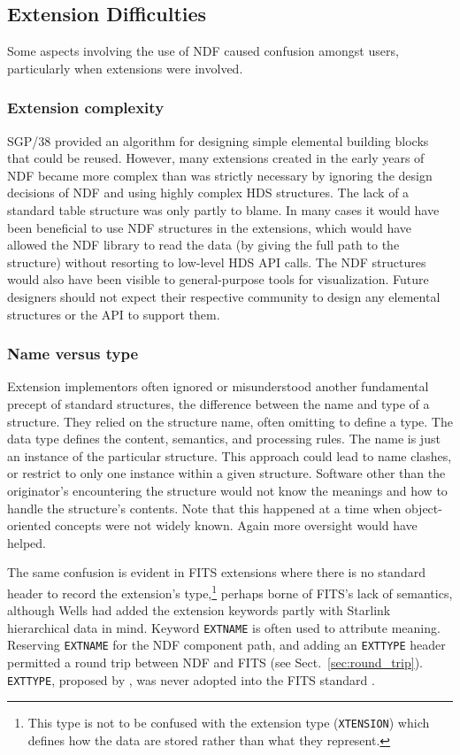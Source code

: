 \documentclass[final,authoryear,5p,times,twocolumn]{elsarticle}
\newcommand*\secref[1]{Sect.~\ref{#1}}
\begin{document}
\subsection{Extension Difficulties}

Some aspects involving the use of NDF caused confusion amongst users,
particularly when extensions were involved.

\subsubsection{Extension complexity}

SGP/38 \citep{SGP38} provided an algorithm for designing simple elemental
building blocks that could be reused. However, many extensions created
in the early years of NDF became more complex than was strictly
necessary by ignoring the design decisions of NDF and using highly
complex HDS structures.  The lack of a standard table structure was
only partly to blame.  In many cases it would have been beneficial to
use NDF structures in the extensions, which would have allowed the NDF
library to read the data (by giving the full path to the structure)
without resorting to low-level HDS API calls.  The NDF structures
would also have been visible to general-purpose tools for
visualization. Future designers should not expect their respective
community to design any elemental structures or the API to support
them.

\subsubsection{Name versus type}

Extension implementors often ignored or misunderstood another
fundamental precept of standard structures, the difference between the
name and type of a structure.  They relied on the structure name,
often omitting to define a type.  The data type defines the content,
semantics, and processing rules.  The name is just an instance of the
particular structure.  This approach could lead to name clashes, or
restrict to only one instance within a given structure.  Software
other than the originator's encountering the structure would not know
the meanings and how to handle the structure's contents.  Note that
this happened at a time when object-oriented concepts were not widely
known.  Again more oversight would have helped.

The same confusion is evident in FITS extensions where there is no
standard header to record the extension's type,\footnote{This type is
not to be confused with the extension type (\texttt{XTENSION}) which
defines how the data are stored rather than what they represent.}
perhaps borne of FITS's lack of semantics, although Wells had added
the extension keywords partly with Starlink hierarchical data in mind.
Keyword \texttt{EXTNAME} is often used to attribute meaning.
Reserving \texttt{EXTNAME} for the NDF component path, and adding an
\texttt{EXTTYPE} header permitted a round trip between NDF and FITS
(see \secref{sec:round_trip}).  \texttt{EXTTYPE}, proposed by
\citet{1993EXTKEYWORDS}, was never adopted into the FITS standard
\citep{1993OGIPMIN}.
\end{document}
